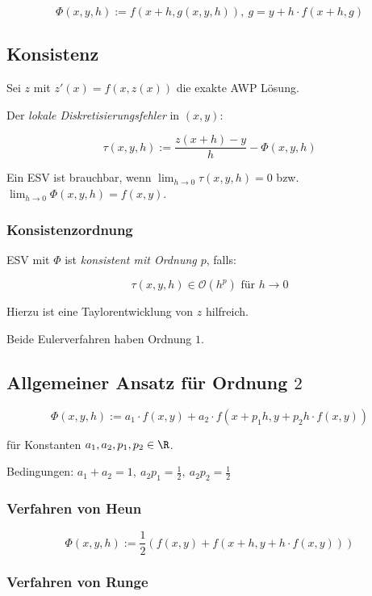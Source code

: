 $$\Phi(x,y,h) := f(x+h, g(x,y,h)), \ g = y + h \cdot f(x+h, g)$$

\subsection*{Konsistenz}

Sei $z$ mit $z'(x) = f(x,z(x))$ die exakte AWP Lösung.

Der \emph{lokale Diskretisierungsfehler} in $(x,y)$:

$$\tau(x,y,h) := \frac{z(x+h)-y}{h} - \Phi(x,y,h)$$

Ein ESV ist brauchbar, wenn $\lim_{h \to 0} \tau(x,y,h) = 0$ bzw. $\lim_{h \to 0} \Phi(x,y,h) = f(x,y)$.

\subsubsection*{Konsistenzordnung}

ESV mit $\Phi$ ist \emph{konsistent mit Ordnung $p$}, falls:

\vspace*{-2mm}
$$\tau(x,y,h) \in \mathcal{O}(h^p) \text{ für } h \to 0$$

Hierzu ist eine Taylorentwicklung von $z$ hilfreich.

Beide Eulerverfahren haben Ordnung $1$.

\subsection*{Allgemeiner Ansatz für Ordnung $2$}

$$\Phi(x,y,h) := a_1 \cdot f(x,y) + a_2 \cdot f(x+p_1 h, y+p_2 h \cdot f(x,y))$$

für Konstanten $a_1, a_2, p_1, p_2 \in \R$.

\spacing

Bedingungen: $a_1 + a_2 = 1, \ a_2 p_1 = \frac{1}{2}, \ a_2 p_2 = \frac{1}{2}$

\subsubsection*{Verfahren von Heun}

$$\Phi(x,y,h) := \frac{1}{2}(f(x,y) + f(x+h, y+h \cdot f(x,y)))$$

\subsubsection*{Verfahren von Runge}

